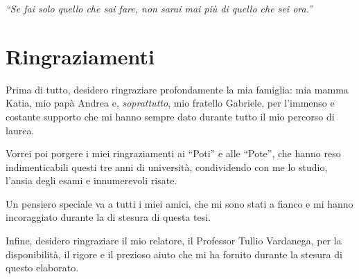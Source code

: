 \cleardoublepage
{}
{}

\begin{flushright}{
    \slshape
    ``Se fai solo quello che sai fare, non sarai mai più di quello che sei ora.''} \\
    \medskip
\end{flushright}

\begingroup
\let\clearpage\relax
\let\cleardoublepage\relax
\let\cleardoublepage\relax

\chapter*{Ringraziamenti}

\vspace{0.35cm}

\noindent Prima di tutto, desidero ringraziare profondamente la mia famiglia: mia mamma Katia, mio papà Andrea e, \textit{soprattutto}, mio fratello Gabriele, per l'immenso e costante supporto che mi hanno sempre dato durante tutto il mio percorso di laurea.

\vspace{0.35cm}

\noindent Vorrei poi porgere i miei ringraziamenti ai ``Poti'' e alle ``Pote'', che hanno reso indimenticabili questi tre anni di università, condividendo con me lo studio, l'ansia degli esami e innumerevoli risate.

\vspace{0.35cm}

\noindent Un pensiero speciale va a tutti i miei amici, che mi sono stati a fianco e mi hanno incoraggiato durante la di stesura di questa tesi.

\vspace{0.35cm}

\noindent Infine, desidero ringraziare il mio relatore, il Professor Tullio Vardanega, per la disponibilità, il rigore e il prezioso aiuto che mi ha fornito durante la stesura di questo elaborato.

\vspace{0.75cm}

\noindent{\myLocation, \myTime}
\hfill \textit{\myName}

\endgroup
